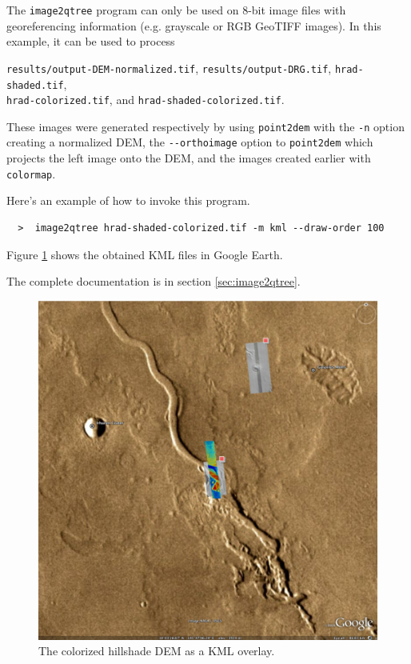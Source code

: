 The \texttt{image2qtree} program can only be used on 8-bit image files
with georeferencing information (e.g. grayscale or RGB GeoTIFF
images). In this example, it can be used to process

\texttt{results/output-DEM-normalized.tif}, \texttt{results/output-DRG.tif}, \texttt{hrad-shaded.tif}, \\
\texttt{hrad-colorized.tif}, and \texttt{hrad-shaded-colorized.tif}.

These images were generated respectively by using \texttt{point2dem}
with the \texttt{-n} option creating a normalized DEM, the
\texttt{-\/-orthoimage} option to \texttt{point2dem} which projects the
left image onto the DEM, and the images created earlier with
\texttt{colormap}.

Here's an example of how to invoke this program.
\begin{verbatim}
  >  image2qtree hrad-shaded-colorized.tif -m kml --draw-order 100
\end{verbatim}

Figure \ref{hrad-kml} shows the obtained KML files in Google Earth.

The complete documentation is in section \ref{sec:image2qtree}.

\begin{figure}[b!]
\begin{center}
\includegraphics[width=6in]{images/p19-googlemars_500px.png}
\caption[Hrad shaded colorized DEM as a KML overlay] {
    \label{hrad-kml}
        The colorized hillshade DEM as a KML overlay.  }
\end{center}
\end{figure}

